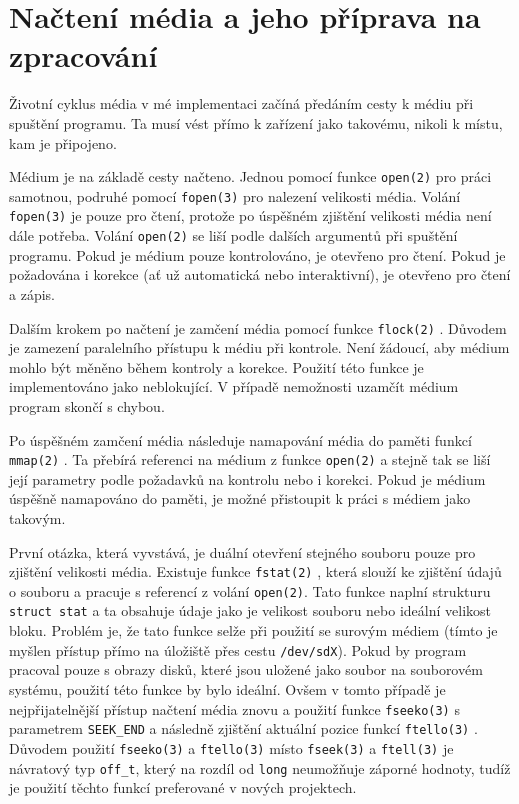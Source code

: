 \section{Načtení média a jeho příprava na zpracování}
Životní cyklus média v mé implementaci začíná předáním cesty k médiu při spuštění programu. Ta musí vést přímo k zařízení jako takovému, nikoli k místu, kam je připojeno.

Médium je na základě cesty načteno. Jednou pomocí funkce \texttt{open(2)} \cite{man-open} pro práci samotnou, podruhé pomocí \texttt{fopen(3)} \cite{man-fopen} pro nalezení velikosti média. Volání \texttt{fopen(3)} je pouze pro čtení, protože po úspěšném zjištění velikosti média není dále potřeba. Volání \texttt{open(2)} se liší podle dalších argumentů při spuštění programu. Pokud je médium pouze kontrolováno, je otevřeno pro čtení. Pokud je požadována i korekce (ať už automatická nebo interaktivní), je otevřeno pro čtení a zápis.

Dalším krokem po načtení je zamčení média pomocí funkce \texttt{flock(2)} \cite{man-flock}. Důvodem je zamezení paralelního přístupu k médiu při kontrole. Není žádoucí, aby médium mohlo být měněno během kontroly a korekce. Použití této funkce je implementováno jako neblokující. V případě nemožnosti uzamčít médium program skončí s chybou.

Po úspěšném zamčení média následuje namapování média do paměti funkcí \texttt{mmap(2)} \cite{man-mmap}. Ta přebírá referenci na médium z funkce \texttt{open(2)} a stejně tak se liší její parametry podle požadavků na kontrolu nebo i korekci. Pokud je médium úspěšně namapováno do paměti, je možné přistoupit k práci s médiem jako takovým.

První otázka, která vyvstává, je duální otevření stejného souboru pouze pro zjištění velikosti média. Existuje funkce \texttt{fstat(2)} \cite{man-fstat}, která slouží ke zjištění údajů o souboru a pracuje s referencí z volání \texttt{open(2)}. Tato funkce naplní strukturu \texttt{struct stat} a ta obsahuje údaje jako je velikost souboru nebo ideální velikost bloku. Problém je, že tato funkce selže při použití se surovým médiem (tímto je myšlen přístup přímo na úložiště přes cestu \texttt{/dev/sdX}). Pokud by program pracoval pouze s obrazy disků, které jsou uložené jako soubor na souborovém systému, použití této funkce by bylo ideální. Ovšem v tomto případě je nejpřijatelnější přístup načtení média znovu a použití funkce \texttt{fseeko(3)} \cite{man-fseeko} s parametrem \texttt{SEEK\_END} a následně zjištění aktuální pozice funkcí \texttt{ftello(3)} \cite{man-ftello}. Důvodem použití \texttt{fseeko(3)} a \texttt{ftello(3)} místo \texttt{fseek(3)} \cite{man-fseek} a \texttt{ftell(3)} \cite{man-ftell} je návratový typ \texttt{off\_t}, který na rozdíl od \texttt{long} neumožňuje záporné hodnoty, tudíž je použití těchto funkcí preferované v nových projektech.

